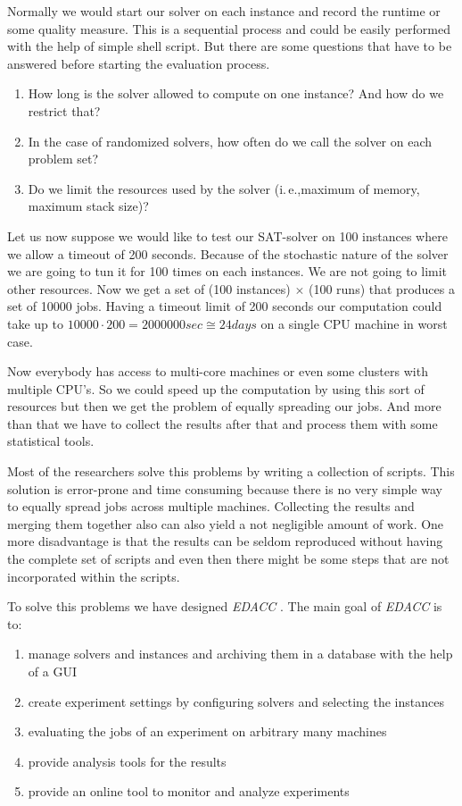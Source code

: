 \documentclass[twoside,a4paper]{refart}
\theoremstyle{dotless}
\newcommand{\ie}{i.\,e.,}
\newcommand{\edacc}{\textit{EDACC} }
\newcounter{ex}
\newcommand{\Eexample}{\color{green}Example \arabic{ex}:  \addtocounter{ex}{1}}
\begin{document}
Normally we would start our solver on each instance and record the runtime or some quality measure. This is a sequential process and could be easily performed with the help of simple shell script. But there are some questions that have to be answered before starting the evaluation process. 

\begin{enumerate}
\item How long is the solver allowed to compute on one instance? And how do we restrict that?
\item In the case of randomized solvers, how often do we call the solver on each problem set?
\item Do we limit the resources used by the solver (\ie maximum of memory, maximum stack size)?
\end{enumerate}

Let us now suppose we would like to test our SAT-solver on 100 instances where we allow a timeout of 200 seconds. \marginlabel{\Eexample}  Because of the stochastic nature of the solver we are going to tun it for 100 times on each instances. We are not going to limit other resources. Now we get a set of (100 instances) $\times$ (100 runs) that produces a set of 10000 jobs. Having a timeout limit of 200 seconds our computation could take up to $10000\cdot 200=2000000sec\cong24 days$ on a single CPU machine in worst case. 

Now everybody has access to multi-core machines or even some clusters with multiple CPU's. So we could speed up the computation by using this sort of resources but then we get the problem of equally spreading our jobs. And more than that we have to collect the results after that and process them with some statistical tools. 

Most of the researchers solve this problems by writing a collection of scripts. This solution is error-prone and time consuming because there is no very simple way to equally spread jobs across multiple machines. Collecting the results and merging them together also can also yield a not negligible amount of work. 
One more disadvantage is that the results can be seldom reproduced without having the complete set of scripts and even then there might be some steps that are not incorporated within the scripts. 

To solve this problems we have designed \edacc. The main goal of \edacc is to:
\begin{enumerate}
	\item manage solvers and instances and archiving them in a database with the help of a GUI
	\item create experiment settings by configuring solvers and selecting the instances
	\item evaluating the jobs of an experiment on arbitrary many machines
	\item provide analysis tools for the results
	\item provide an online tool to monitor and analyze experiments
\end{enumerate}
\end{document}
